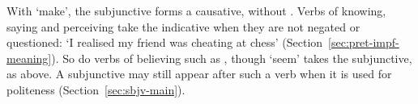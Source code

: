 With  `make', the subjunctive forms a causative, without .
Verbs of knowing, saying and perceiving take the indicative when they are not negated or questioned:  `I realised my friend was cheating at chess' (Section~\ref{sec:pret-impf-meaning}). So do verbs of believing such as , though  `seem' takes the subjunctive, as above.
A subjunctive may still appear after such a verb when it is used for politeness (Section~\ref{sec:sbjv-main}).

